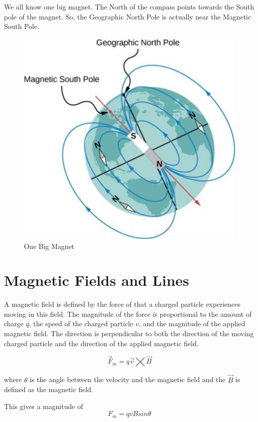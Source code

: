 \documentclass[14pt]{memoir}
\begin{document}
We all know one big magnet. The North of the compass points towards the South pole of the magnet. So, the Geographic North Pole is actually near the Magnetic South Pole. 

\begin{figure}[H]
\begin{center}
\includegraphics[scale=0.50]{fig/fig_11_02.jpg}
\caption{One Big Magnet}
\label{fig:11_02}
\end{center}
\end{figure}

\section{Magnetic Fields and Lines}

A magnetic field is defined by the force of that a charged particle experiences moving in this field. The magnitude of the force is proportional to the amount of charge $q$, the speed of the charged particle $v$, and the magnitude of the applied magnetic field. The direction is perpendicular to both the direction of the moving charged particle and the direction of the applied magnetic field. 

\begin{equation}
\vec{F}_m = q \vec{v} \bigtimes \vec{B}
\end{equation}

where $\theta$ is the angle between the velocity and the magnetic field and the $\vec{B}$ is defined as the magnetic field. 

This gives a magnitude of
\begin{equation}
F_m = q v B sin \theta
\end{equation}
\end{document}
